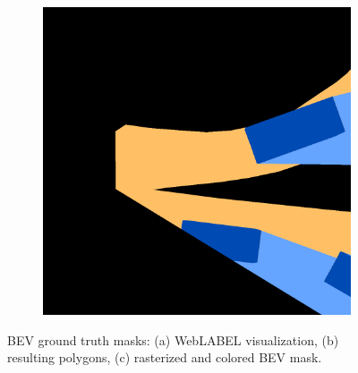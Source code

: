\begin{figure}[htbp]
\begin{subfigure}[b]{0.3\textwidth}
        \caption{}
        \label{fig:gt_occ2_masks_b}
    \end{subfigure}
    \hfill
    \begin{subfigure}[b]{0.3\textwidth}
        \includegraphics[width=\textwidth, height=\textwidth]{images/methodology/gt_occ2_maks/gt_occ_mask_colored_8.png}
        \caption{}
        \label{fig:gt_occ2_masks_c}
    \end{subfigure}

    \caption{BEV ground truth masks: (a) WebLABEL visualization, (b) resulting polygons, (c) rasterized and colored BEV mask.}
    \label{fig:gt_occ2_masks}
\end{figure}
